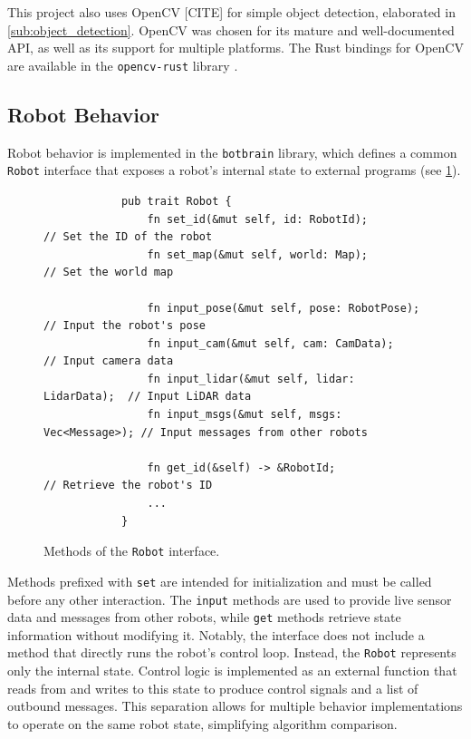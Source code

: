 This project also uses OpenCV {\color{red} [CITE]} for simple object detection, elaborated in \cref{sub:object_detection}. OpenCV was chosen for its mature and well-documented API, as well as its support for multiple platforms. The Rust bindings for OpenCV are available in the \texttt{opencv-rust} library \cite{opencv-rust}.


\subsection{Robot Behavior}
Robot behavior is implemented in the \texttt{botbrain} library, which defines a common \texttt{Robot} interface that exposes a robot’s internal state to external programs (see \cref{fig:robot-interface}).

\begin{figure}[H]
    \begin{center}
        \begin{verbatim}
            pub trait Robot {
                fn set_id(&mut self, id: RobotId);            // Set the ID of the robot
                fn set_map(&mut self, world: Map);            // Set the world map

                fn input_pose(&mut self, pose: RobotPose);    // Input the robot's pose
                fn input_cam(&mut self, cam: CamData);        // Input camera data
                fn input_lidar(&mut self, lidar: LidarData);  // Input LiDAR data
                fn input_msgs(&mut self, msgs: Vec<Message>); // Input messages from other robots

                fn get_id(&self) -> &RobotId;                 // Retrieve the robot's ID
                ...
            }
        \end{verbatim}
    \end{center}
    \caption{Methods of the \texttt{Robot} interface.}
    \label{fig:robot-interface}
\end{figure}

Methods prefixed with \texttt{set} are intended for initialization and must be called before any other interaction. The \texttt{input} methods are used to provide live sensor data and messages from other robots, while \texttt{get} methods retrieve state information without modifying it. Notably, the interface does not include a method that directly runs the robot’s control loop. Instead, the \texttt{Robot} represents only the internal state. Control logic is implemented as an external function that reads from and writes to this state to produce control signals and a list of outbound messages. This separation allows for multiple behavior implementations to operate on the same robot state, simplifying algorithm comparison.

